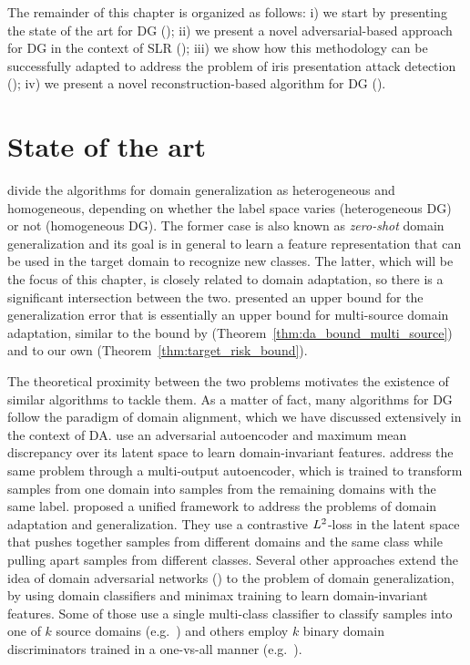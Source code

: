 The remainder of this chapter is organized as follows: i) we start by presenting the state of the art for DG (); ii) we present a novel adversarial-based approach for DG in the context of SLR (); iii) we show how this methodology can be successfully adapted to address the problem of iris presentation attack detection (); iv) we present a novel reconstruction-based algorithm for DG ().

\section{State of the art}
\label{sec:dg_sota}
\citet{Zhou2021} divide the algorithms for domain generalization as heterogeneous and homogeneous, depending on whether the label space varies (heterogeneous DG) or not (homogeneous DG). The former case is also known as \emph{zero-shot} domain generalization and its goal is in general to learn a feature representation that can be used in the target domain to recognize new classes. The latter, which will be the focus of this chapter, is closely related to domain adaptation, so there is a significant intersection between the two. \citet{Albuquerque2019} presented an upper bound for the generalization error that is essentially an upper bound for multi-source domain adaptation, similar to the bound by \citet{Zhao2018} (Theorem~\ref{thm:da_bound_multi_source}) and to our own (Theorem~\ref{thm:target_risk_bound}).

The theoretical proximity between the two problems motivates the existence of similar algorithms to tackle them. As a matter of fact, many algorithms for DG follow the paradigm of domain alignment, which we have discussed extensively in the context of DA. \citet{Li2018} use an adversarial autoencoder and maximum mean discrepancy over its latent space to learn domain-invariant features. \citet{Ghifary2015} address the same problem through a multi-output autoencoder, which is trained to transform samples from one domain into samples from the remaining domains with the same label. \citet{Motiian2017} proposed a unified framework to address the problems of domain adaptation and generalization. They use a contrastive $L^2$-loss in the latent space that pushes together samples from different domains and the same class while pulling apart samples from different classes. Several other approaches extend the idea of domain adversarial networks (\citet{Ganin2015}) to the problem of domain generalization, by using domain classifiers and minimax training to learn domain-invariant features. Some of those use a single multi-class classifier to classify samples into one of $k$ source domains (e.g.\ \citet{Aslani2020, Matsuura2020}) and others employ $k$ binary domain discriminators trained in a one-vs-all manner (e.g.\ \citet{Shao2019, YaLi2018}).

